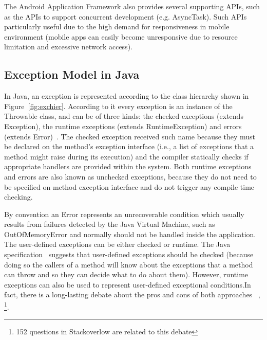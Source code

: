 \documentclass[conference]{IEEEtran}
\begin{document}
The Android Application Framework also provides several supporting APIs, such as 
the APIs to support concurrent development (e.g. AsyncTask). 
Such APIs particularly useful due to the high demand for responsiveness 
in mobile environment (mobile apps can easily become 
unresponsive due to resource limitation and excessive network access).



\subsection{Exception Model in Java} \label{sec:extypes}

In Java, an exception is represented according to the class hierarchy shown in
Figure~\ref{fig:exchier}.  According to it every exception is an
instance of the Throwable class, and can be of three kinds: the checked exceptions
(extends Exception), the runtime exceptions (extends RuntimeException) and errors
(extends Error)~\cite{gosling2000java}. The checked exception received such name
 because they must be declared on the method's exception interface (i.e., a list of exceptions that a method 
might raise during its execution) and the compiler statically checks if
 appropriate handlers are provided within the system.
Both runtime exceptions and errors are also known as unchecked exceptions, because 
they do not need to be specified on method exception interface and do not trigger any 
compile time checking.

By convention an Error represents an unrecoverable condition which usually results
from failures detected by the Java Virtual Machine, such as OutOfMemoryError and
normally should not be handled inside the application. The user-defined exceptions 
can be either checked or runtime. The Java specification~\cite{gosling2000java} 
suggests that user-defined exceptions should be checked (because doing so 
the callers of a method will know about the exceptions that a method can throw and so 
they can decide what to do about them). However, runtime exceptions can also be 
used to represent user-defined exceptional conditions.In fact, there is a long-lasting debate 
about the pros and cons of both approaches ~\cite{javatut,stackoverlow,debate},
\footnote{152 questions in Stackoverlow are related to this debate}.
\end{document}
